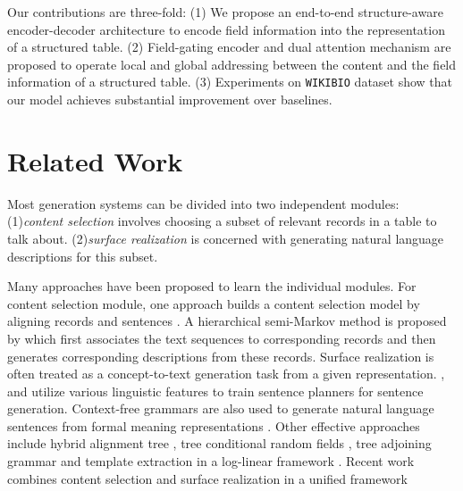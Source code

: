 \documentclass[letterpaper]{article} %
\begin{document}
Our contributions are three-fold:
(1) We propose an end-to-end structure-aware encoder-decoder architecture to encode field information into the representation of a structured table.
(2) Field-gating encoder and dual attention mechanism are proposed to operate local and global addressing between the content and the field information of a structured table. 
(3) Experiments on \texttt{WIKIBIO} dataset show that our model achieves substantial improvement over baselines.
 

\section{Related Work}
Most generation systems can be divided into two independent modules: 
(1)\textit{content selection} involves choosing a subset of relevant records in a table to talk about.
(2)\textit{surface realization} is concerned with generating natural language descriptions for this subset.

Many approaches have been proposed to learn the individual modules. 
For content selection module, one approach builds a content selection model by aligning records and sentences \cite{barzilay2005collective,duboue2002content}. 
A hierarchical semi-Markov method is proposed by \cite{liang2009learning} which first associates the text sequences to corresponding records and then generates corresponding descriptions from these records.
Surface realization is often treated as a concept-to-text generation task from a given representation. 
\citeauthor{reiter2000building} , \citeauthor{walker2001spot}  and \citeauthor{stent2004trainable}  utilize various linguistic features to train sentence planners for sentence generation. 
Context-free grammars are also used to generate natural language sentences from formal meaning representations \cite{lu2011probabilistic,belz2008automatic}. 
Other effective approaches include hybrid alignment tree \cite{kim2010generative}, tree conditional random fields \cite{lu2009natural}, tree adjoining grammar \cite{gyawali2016surface} and template extraction in a log-linear framework \cite{angeli2010simple}.
Recent work combines content selection and surface realization in a unified framework \cite{ratnaparkhi2002trainable,konstas2012unsupervised,konstas2013global,DBLP:journals/corr/abs-1709-00155}
\end{document}
